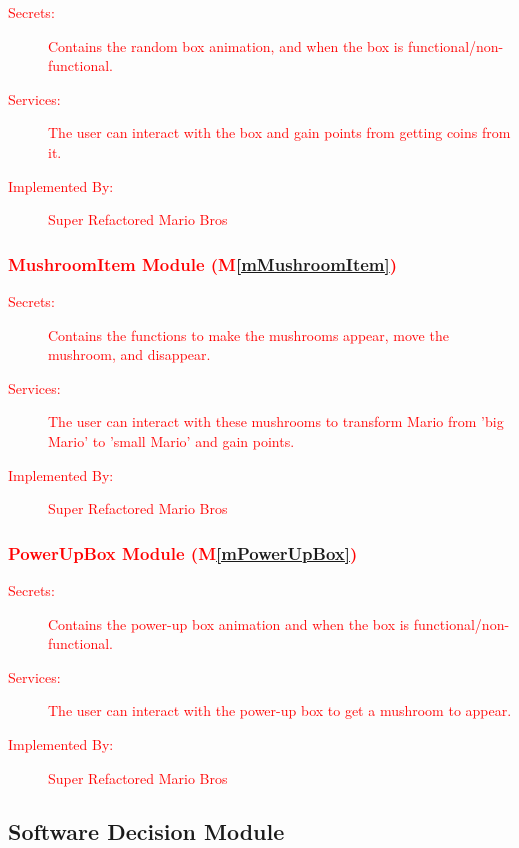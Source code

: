 \documentclass[12pt, titlepage]{article}
\newcommand{\mref}[1]{M\ref{#1}}
\begin{document}
\begin{description}
\item[\textcolor{red}{Secrets:}] \textcolor{red}{Contains the random box animation, and when the box is functional/non-functional.}
\item[\textcolor{red}{Services:}] \textcolor{red}{The user can interact with the box and gain points from getting coins from it.}
\item[\textcolor{red}{Implemented By:}] \textcolor{red}{Super Refactored Mario Bros}
\end{description}

\subsubsection{\textcolor{red}{MushroomItem Module (\mref{mMushroomItem})}}

\begin{description}
\item[\textcolor{red}{Secrets:}] \textcolor{red}{Contains the functions to make the mushrooms appear, move the mushroom, and disappear.}
\item[\textcolor{red}{Services:}] \textcolor{red}{The user can interact with these mushrooms to transform Mario from 'big Mario' to 'small Mario' and gain points.}
\item[\textcolor{red}{Implemented By:}] \textcolor{red}{Super Refactored Mario Bros}
\end{description}

\subsubsection{\textcolor{red}{PowerUpBox Module (\mref{mPowerUpBox})}}

\begin{description}
\item[\textcolor{red}{Secrets:}] \textcolor{red}{Contains the power-up box animation and when the box is functional/non-functional.}
\item[\textcolor{red}{Services:}] \textcolor{red}{The user can interact with the power-up box to get a mushroom to appear.}
\item[\textcolor{red}{Implemented By:}] \textcolor{red}{Super Refactored Mario Bros}
\end{description}

\subsection{Software Decision Module}
\end{document}
